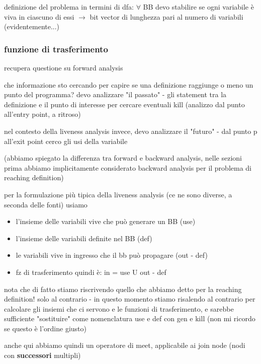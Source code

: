 definizione del problema in termini di dfa: $\forall$ BB devo stabilire se ogni variabile \`e viva in ciascuno di essi $\rightarrow$ bit vector di lunghezza pari al numero di variabili (evidentemente...)

\subsubsection{funzione di trasferimento}

recupera questione su forward analysis

che informazione sto cercando per capire se una definizione raggiunge o meno un punto del programma? devo analizzare "il passato" - gli statement tra la definizione e il punto di interesse per cercare eventuali kill (analizzo dal punto all'entry point, a ritroso)

nel contesto della liveness analysis invece, devo analizzare il "futuro" - dal punto p all'exit point cerco gli usi della variabile

(abbiamo spiegato la differenza tra forward e backward analysis, nelle sezioni prima abbiamo implicitamente considerato backward analysis per il problema di reaching definition)

per la formulazione pi\`u tipica della liveness analysis (ce ne sono diverse, a seconda delle fonti) usiamo
\begin{itemize}
  \item l'insieme delle variabili vive che pu\`o generare un BB (use)
  \item l'insieme delle variabili definite nel BB (def)
  \item le variabili vive in ingresso che il bb pu\`o propagare (out - def)
  \item fz di trasferimento quindi \`e: in = use U out - def
\end{itemize}

\begin{emphasize}
    nota che di fatto stiamo riscrivendo quello che abbiamo detto per la reaching definition! solo al contrario - in questo momento stiamo risalendo al contrario per calcolare gli insiemi che ci servono e le funzioni di trasferimento, e sarebbe sufficiente "sostituire" come nomenclatura use e def con gen e kill (non mi ricordo se questo \`e l'ordine giusto)
\end{emphasize}

anche qui abbiamo quindi un operatore di meet, applicabile ai join node (nodi con \textbf{successori} multipli)


